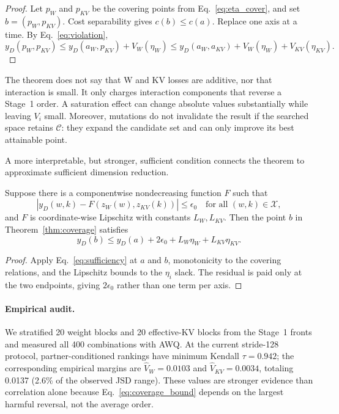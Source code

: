 \begin{proof}
Let $p_W$ and $p_{KV}$ be the covering points from
Eq.~\eqref{eq:eta_cover}, and set $b=(p_W,p_{KV})$.  Cost separability gives
$c(b)\le c(a)$.  Replace one axis at a time.  By
Eq.~\eqref{eq:violation},
\[
 y_D(p_W,p_{KV})
 \le y_D(a_W,p_{KV})+V_W(\eta_W)
 \le y_D(a_W,a_{KV})+V_W(\eta_W)+V_{KV}(\eta_{KV}).
\]
\end{proof}

The theorem does not say that W and KV losses are additive, nor that interaction
is small.  It only charges interaction components that reverse a Stage~1 order.
A saturation effect can change absolute values substantially while leaving
$V_i$ small.  Moreover, mutations do not invalidate the result if the searched
space retains $\mathcal{C}$: they expand the candidate set and can only improve
its best attainable point.

A more interpretable, but stronger, sufficient condition connects the theorem
to approximate sufficient dimension reduction.

\begin{corollary}
\label{cor:sufficiency}
Suppose there is a componentwise nondecreasing function $F$ such that
\begin{equation}
 \left|y_D(w,k)-F(z_W(w),z_{KV}(k))\right|\le\epsilon_0
 \quad\text{for all }(w,k)\in\mathcal{X},
 \label{eq:sufficiency}
\end{equation}
and $F$ is coordinate-wise Lipschitz with constants $L_W,L_{KV}$.  Then the
point $b$ in Theorem~\ref{thm:coverage} satisfies
\begin{equation}
 y_D(b)\le y_D(a)+2\epsilon_0+L_W\eta_W+L_{KV}\eta_{KV}.
 \label{eq:sufficient_bound}
\end{equation}
\end{corollary}

\begin{proof}
Apply Eq.~\eqref{eq:sufficiency} at $a$ and $b$, monotonicity to the covering
relations, and the Lipschitz bounds to the $\eta_i$ slack.  The residual is paid
only at the two endpoints, giving $2\epsilon_0$ rather than one term per axis.
\end{proof}

\paragraph{Empirical audit.}
We stratified 20 weight blocks and 20 effective-KV blocks from the Stage~1
fronts and measured all 400 combinations with AWQ.  At the current stride-128
protocol, partner-conditioned rankings have minimum Kendall $\tau=0.942$; the
corresponding empirical margins are
$\widehat V_W=0.0103$ and $\widehat V_{KV}=0.0034$, totaling 0.0137 (2.6\% of
the observed JSD range).  These values are stronger evidence than correlation
alone because Eq.~\eqref{eq:coverage_bound} depends on the largest harmful
reversal, not the average order.

